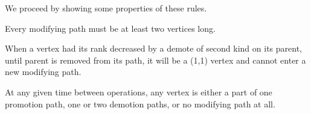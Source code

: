 We proceed by showing some properties of these rules.

\begin{obs}
Every modifying path must be at least two vertices long.
\end{obs}

\begin{obs}
When a vertex had its rank decreased by a demote of second kind on its parent, until parent is removed from its path, it will be a (1,1) vertex and cannot enter a new modifying path. 
\end{obs}

\begin{prop}
At any given time between operations, any vertex is either a part of one promotion path, one or two demotion paths, or no modifying path at all.
\end{prop}

